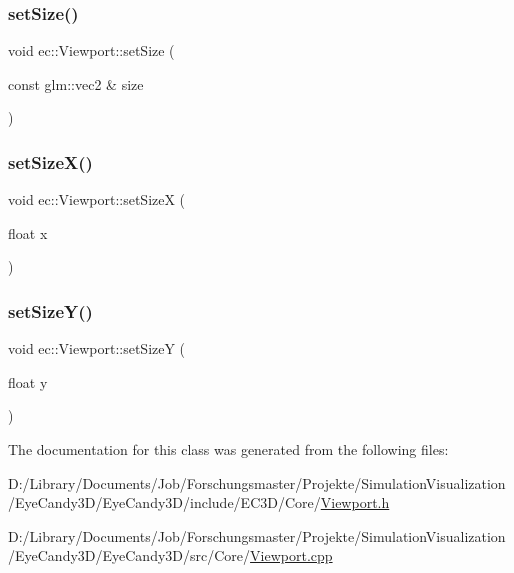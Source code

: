 \mbox{\label{classec_1_1_viewport_ad8e05ac01f4c19c599f6b7dc344b815c}} 
\subsubsection{\texorpdfstring{set\+Size()}{setSize()}\hspace{0.1cm}{\footnotesize\ttfamily [2/2]}}
{\footnotesize\ttfamily void ec\+::\+Viewport\+::set\+Size (\begin{DoxyParamCaption}\item[{const glm\+::vec2 \&}]{size }\end{DoxyParamCaption})}

\mbox{\label{classec_1_1_viewport_af1bcf1e3a8a06458c41a0c646b5f2057}} 
\subsubsection{\texorpdfstring{set\+Size\+X()}{setSizeX()}}
{\footnotesize\ttfamily void ec\+::\+Viewport\+::set\+SizeX (\begin{DoxyParamCaption}\item[{float}]{x }\end{DoxyParamCaption})}

\mbox{\label{classec_1_1_viewport_ae9420c066d2bf6f1a6cc5c0b65092862}} 
\subsubsection{\texorpdfstring{set\+Size\+Y()}{setSizeY()}}
{\footnotesize\ttfamily void ec\+::\+Viewport\+::set\+SizeY (\begin{DoxyParamCaption}\item[{float}]{y }\end{DoxyParamCaption})}



The documentation for this class was generated from the following files\+:\begin{DoxyCompactItemize}
\item 
D\+:/\+Library/\+Documents/\+Job/\+Forschungsmaster/\+Projekte/\+Simulation\+Visualization/\+Eye\+Candy3\+D/\+Eye\+Candy3\+D/include/\+E\+C3\+D/\+Core/\mbox{\hyperlink{_viewport_8h}{Viewport.\+h}}\item 
D\+:/\+Library/\+Documents/\+Job/\+Forschungsmaster/\+Projekte/\+Simulation\+Visualization/\+Eye\+Candy3\+D/\+Eye\+Candy3\+D/src/\+Core/\mbox{\hyperlink{_viewport_8cpp}{Viewport.\+cpp}}\end{DoxyCompactItemize}
